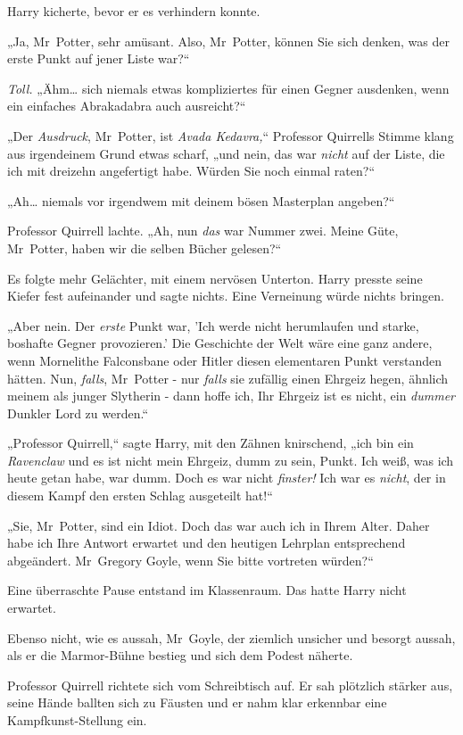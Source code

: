 {Harry kicherte, bevor er es verhindern konnte.

„Ja, Mr~Potter, sehr amüsant. Also, Mr~Potter, können Sie sich denken, was der erste Punkt auf jener Liste war?“

\emph{Toll.} „Ähm… sich niemals etwas kompliziertes für einen Gegner ausdenken, wenn ein einfaches Abrakadabra auch ausreicht?“

„Der \emph{Ausdruck}, Mr~Potter, ist \emph{Avada Kedavra,}“ Professor Quirrells Stimme klang aus irgendeinem Grund etwas scharf, „und nein, das war \emph{nicht} auf der Liste, die ich mit dreizehn angefertigt habe. Würden Sie noch einmal raten?“

„Ah… niemals vor irgendwem mit deinem bösen Masterplan angeben?“

Professor Quirrell lachte. „Ah, nun \emph{das} war Nummer zwei. Meine Güte, Mr~Potter, haben wir die selben Bücher gelesen?“

Es folgte mehr Gelächter, mit einem nervösen Unterton. Harry presste seine Kiefer fest aufeinander und sagte nichts. Eine Verneinung würde nichts bringen.

„Aber nein. Der \emph{erste} Punkt war, 'Ich werde nicht herumlaufen und starke, boshafte Gegner provozieren.' Die Geschichte der Welt wäre eine ganz andere, wenn Mornelithe Falconsbane oder Hitler diesen elementaren Punkt verstanden hätten. Nun, \emph{falls}, Mr~Potter - nur \emph{falls} sie zufällig einen Ehrgeiz hegen, ähnlich meinem als junger Slytherin - dann hoffe ich, Ihr Ehrgeiz ist es nicht, ein \emph{dummer} Dunkler Lord zu werden.“

„Professor Quirrell,“ sagte Harry, mit den Zähnen knirschend, „ich bin ein \emph{Ravenclaw} und es ist nicht mein Ehrgeiz, dumm zu sein, Punkt. Ich weiß, was ich heute getan habe, war dumm. Doch es war nicht \emph{finster!} Ich war es \emph{nicht}, der in diesem Kampf den ersten Schlag ausgeteilt hat!“

„Sie, Mr~Potter, sind ein Idiot. Doch das war auch ich in Ihrem Alter. Daher habe ich Ihre Antwort erwartet und den heutigen Lehrplan entsprechend abgeändert. Mr~Gregory Goyle, wenn Sie bitte vortreten würden?“

Eine überraschte Pause entstand im Klassenraum. Das hatte Harry nicht erwartet.

Ebenso nicht, wie es aussah, Mr~Goyle, der ziemlich unsicher und besorgt aussah, als er die Marmor-Bühne bestieg und sich dem Podest näherte.

Professor Quirrell richtete sich vom Schreibtisch auf. Er sah plötzlich stärker aus, seine Hände ballten sich zu Fäusten und er nahm klar erkennbar eine Kampfkunst-Stellung ein.

}
